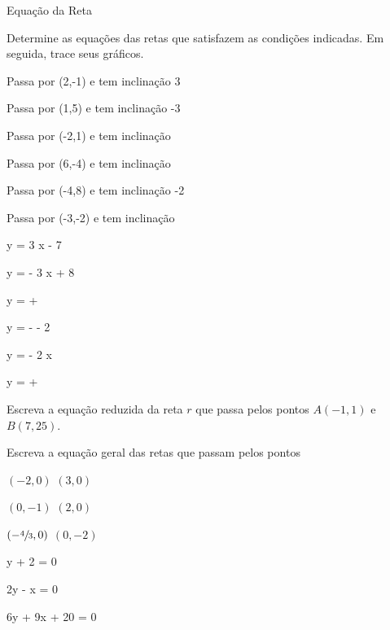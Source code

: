 \begin{exercicios}{Equação da Reta}
    \begin{exercicio}
        Determine as equações das retas que satisfazem as condições indicadas. Em seguida, trace seus gráficos.
        \begin{alphalist}
            \item Passa por (2,-1)  e tem inclinação 3
            \item Passa por (1,5)   e tem inclinação -3
            \item Passa por (-2,1)  e tem inclinação 
            \item Passa por (6,-4)  e tem inclinação 
            \item Passa por (-4,8)  e tem inclinação -2
            \item Passa por (-3,-2) e tem inclinação 
        \end{alphalist}
        \begin{answers}
            \begin{mathlist}[3]
                \item y = 3 x - 7
                \item y = - 3 x + 8
                \item y =  + 
                \item y = -  - 2
                \item y = - 2 x
                \item y =  + 
            \end{mathlist}
        \end{answers}
    \end{exercicio}

    \begin{exercicio}
        Escreva a equação reduzida da reta $r$ que passa pelos pontos $A(-1,1)$ e $B(7,25)$.
    \end{exercicio}
    
    \begin{exercicio}
        Escreva a equação geral das retas que passam pelos pontos
        \begin{alphalist}
            \item $(-2,0)$ \tabto{3cm} $(3,0)$
            \item $(0,-1)$ \tabto{3cm} $(2,0)$
            \item $(-\sfrac{4}{3},0)$ \tabto{3cm} $(0,-2)$
        \end{alphalist}
        \begin{answers}
            \begin{mathlist}[3]
                \item  y + 2  = 0
                \item 2y -  x = 0
                \item 6y + 9x + 20 = 0
            \end{mathlist}
        \end{answers}
    \end{exercicio}
    

\end{exercicios}
